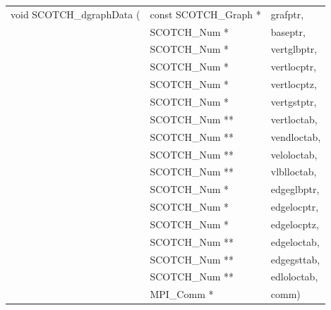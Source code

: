 \begin{itemize}
\progsyn

{\tt\begin{tabular}{l@{}ll}
void SCOTCH\_dgraphData ( & const SCOTCH\_Graph * & grafptr,    \\
                          & SCOTCH\_Num *         & baseptr,    \\
                          & SCOTCH\_Num *         & vertglbptr, \\
                          & SCOTCH\_Num *         & vertlocptr, \\
                          & SCOTCH\_Num *         & vertlocptz, \\
                          & SCOTCH\_Num *         & vertgstptr, \\
                          & SCOTCH\_Num **        & vertloctab, \\
                          & SCOTCH\_Num **        & vendloctab, \\
                          & SCOTCH\_Num **        & veloloctab, \\
                          & SCOTCH\_Num **        & vlblloctab, \\
                          & SCOTCH\_Num *         & edgeglbptr, \\
                          & SCOTCH\_Num *         & edgelocptr, \\
                          & SCOTCH\_Num *         & edgelocptz, \\
                          & SCOTCH\_Num **        & edgeloctab, \\
                          & SCOTCH\_Num **        & edgegsttab, \\
                          & SCOTCH\_Num **        & edloloctab, \\
                          & MPI\_Comm *           & comm)
\end{tabular}}


\end{itemize}
